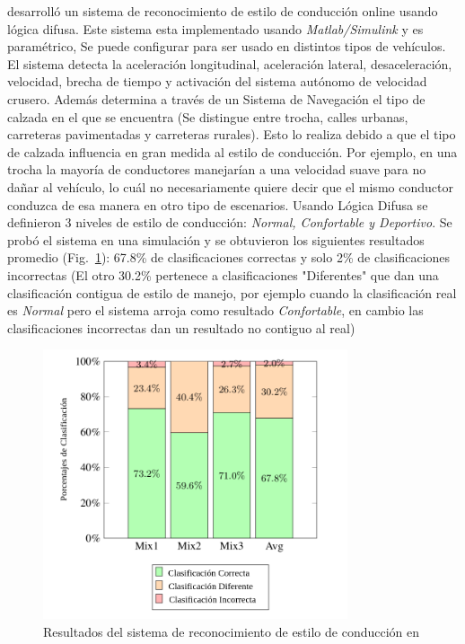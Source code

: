 \citeauthor{6957822} \cite{6957822} desarrolló un sistema de reconocimiento de estilo de conducción online usando lógica difusa. Este sistema esta implementado usando {\it Matlab/Simulink}  y es paramétrico, Se puede configurar para ser usado en distintos tipos de vehículos.
El sistema detecta la aceleración longitudinal, aceleración lateral, desaceleración, velocidad, brecha de tiempo y activación del sistema autónomo de velocidad crusero. Además determina a través de un Sistema de Navegación el tipo de calzada en el que se encuentra (Se distingue entre trocha, calles urbanas, carreteras pavimentadas y carreteras rurales). Esto lo realiza debido a que el tipo de calzada influencia en gran medida al estilo de conducción. Por ejemplo, en una trocha la mayoría de conductores manejarían a una velocidad suave para no dañar al vehículo, lo cuál no necesariamente quiere decir que el mismo conductor conduzca de esa manera en otro tipo de escenarios.
Usando Lógica Difusa se definieron 3 niveles de estilo de conducción: {\it Normal, Confortable y Deportivo}. Se probó el sistema en una simulación y se obtuvieron los siguientes resultados promedio (Fig.~\ref{fig:2.2}): 67.8\% de clasificaciones correctas y solo 2\% de clasificaciones incorrectas (El otro 30.2\% pertenece a clasificaciones "Diferentes" que dan una clasificación contigua de estilo de manejo, por ejemplo cuando la clasificación real es {\it Normal} pero el sistema arroja como resultado {\it Confortable}, en cambio las clasificaciones incorrectas dan un resultado no contiguo al real)

\begin{figure}[htbp!]
\centering
\includegraphics[width=0.8\textwidth]{Fig2}
\caption[Resultados del sistema de reconocimiento de estilo de conducción]{Resultados del sistema de reconocimiento de estilo de conducción en \cite{6957822}}
\label{fig:2.2}
\end{figure}

